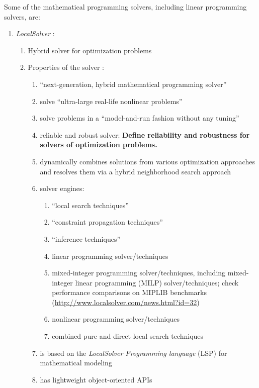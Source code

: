 Some of the mathematical programming solvers, including linear programming solvers, are: \vspace{-0.3cm}
\begin{enumerate} \itemsep -4pt
\item {\it LocalSolver} \cite{Innovation24Staff2015}: \vspace{-0.3cm}
	\begin{enumerate} \itemsep -2pt
	\item Hybrid solver for optimization problems
	\item Properties of the solver \cite[Product: Overview]{Innovation24Staff2015}: \vspace{-0.2cm}
		\begin{enumerate} \itemsep -2pt
		\item ``next-generation, hybrid mathematical programming solver''
		\item solve ``ultra-large real-life nonlinear problems''
		\item solve problems in a ``model-and-run fashion without any tuning''
		\item reliable and robust solver: {\bf Define reliability and robustness for solvers of optimization problems.}
		\item dynamically combines solutions from various optimization approaches and resolves them via a hybrid neighborhood search approach
		\item solver engines: \vspace{-0.1cm}
			\begin{enumerate} \itemsep -1pt
			\item ``local search techniques''
			\item ``constraint propagation techniques''
			\item ``inference techniques''
			\item linear programming solver/techniques
			\item mixed-integer programming solver/techniques, including mixed-integer linear programming (MILP) solver/techniques; check performance comparisons on {MIPLIB} benchmarks (\url{http://www.localsolver.com/news.html?id=32})
			\item nonlinear programming solver/techniques
			\item combined pure and direct local search techniques
			\end{enumerate}
		\item is based on the {\it LocalSolver Programming language} (LSP) for mathematical modeling
		\item has lightweight object-oriented APIs

\end{enumerate}
\end{enumerate}
\end{enumerate}
